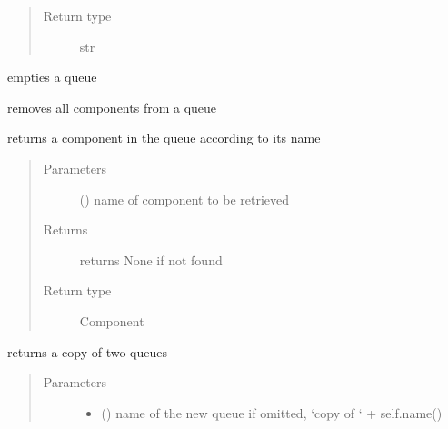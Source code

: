 \documentclass[letterpaper,10pt,english]{sphinxmanual}
\begin{document}
\begin{fulllineitems}
\begin{fulllineitems}
\begin{quote}
\begin{description}
\item[{Return type}] \leavevmode
str

\end{description}\end{quote}

\end{fulllineitems}


\begin{fulllineitems}
\label{\detokenize{Reference:salabim.Queue.clear}}
empties a queue

removes all components from a queue

\end{fulllineitems}


\begin{fulllineitems}
\label{\detokenize{Reference:salabim.Queue.component_with_name}}
returns a component in the queue according to its name
\begin{quote}\begin{description}
\item[{Parameters}] \leavevmode
{} () \textendash{} name of component to be retrieved

\item[{Returns}] \leavevmode
{} \textendash{} returns None if not found

\item[{Return type}] \leavevmode
Component 

\end{description}\end{quote}

\end{fulllineitems}


\begin{fulllineitems}
\label{\detokenize{Reference:salabim.Queue.copy}}
returns a copy of two queues
\begin{quote}\begin{description}
\item[{Parameters}] \leavevmode\begin{itemize}
\item {} 
 () \textendash{} name of the new queue 
if omitted, ‘copy of ‘ + self.name()


\end{itemize}
\end{description}
\end{quote}
\end{fulllineitems}
\end{fulllineitems}
\end{document}
